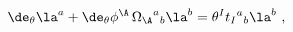\begin{equation}
  \de_\theta \la^a + \de_\theta \phi^\A\, {\Omega_\A}^a{}_b \la^b =
  \theta^I {t_I}^a{}_b \la^b\ ,
 \end{equation}

